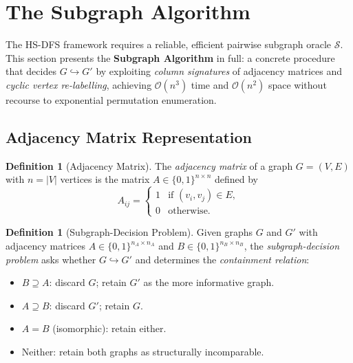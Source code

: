 ﻿\documentclass[12pt,a4paper]{article}
\theoremstyle{plain}
\theoremstyle{definition}
\newtheorem{definition}[theorem]{Definition}
\theoremstyle{remark}
\begin{document}
	\section{The Subgraph Algorithm}
	\label{sec:subgraph}

	The HS-DFS framework requires a reliable, efficient pairwise subgraph oracle
	$\mathcal{S}$.  This section presents the \textbf{Subgraph Algorithm}
	\cite{epp2026subgraph} in full: a concrete procedure that decides
	$G \hookrightarrow G'$ by exploiting \emph{column signatures} of adjacency
	matrices and \emph{cyclic vertex re-labelling}, achieving
	$\mathcal{O}(n^3)$ time and $\mathcal{O}(n^2)$ space without recourse to
	exponential permutation enumeration.

	\subsection{Adjacency Matrix Representation}

	\begin{definition}[Adjacency Matrix]
		\label{def:adjmat}
		The \emph{adjacency matrix} of a graph $G = (V, E)$ with $n = |V|$ vertices
		is the matrix $A \in \{0,1\}^{n \times n}$ defined by
		\[
		A_{ij} = \begin{cases}
			1 & \text{if } (v_i, v_j) \in E, \\
			0 & \text{otherwise.}
		\end{cases}
		\]
	\end{definition}

	\begin{definition}[Subgraph-Decision Problem]
		\label{def:subgraph_decision}
		Given graphs $G$ and $G'$ with adjacency matrices
		$A \in \{0,1\}^{n_A \times n_A}$ and $B \in \{0,1\}^{n_B \times n_B}$,
		the \emph{subgraph-decision problem} asks whether $G \hookrightarrow G'$
		and determines the \emph{containment relation}:
		\begin{itemize}
			\item $B \supseteq A$: discard $G$; retain $G'$ as the more informative graph.
			\item $A \supseteq B$: discard $G'$; retain $G$.
			\item $A = B$ (isomorphic): retain either.
			\item Neither: retain both graphs as structurally incomparable.
		\end{itemize}
	\end{definition}
\end{document}
